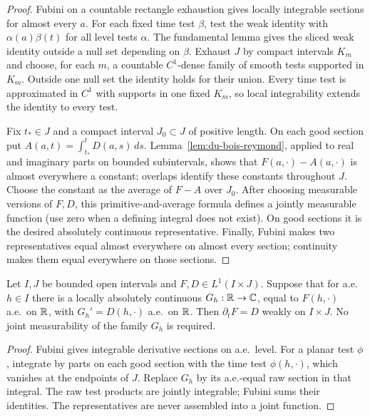\begin{proof}
\leanok
Fubini on a countable rectangle exhaustion gives locally integrable
sections for almost every $a$. For each fixed time test $\beta$, test
the weak identity with $\alpha(a)\beta(t)$ for all level tests $\alpha$.
The fundamental lemma gives the sliced weak identity outside a null
set depending on $\beta$. Exhaust $J$ by compact intervals $K_m$ and
choose, for each $m$, a countable $C^1$-dense family of smooth tests
supported in $K_m$. Outside one null set the identity holds for their
union. Every time test is approximated in $C^1$ with supports in one
fixed $K_m$, so local integrability extends the identity to every test.

Fix $t_*\in J$ and a compact interval $J_0\subset J$ of positive length.
On each good section put
$A(a,t)=\int_{t_*}^tD(a,s)\,ds$. Lemma~\ref{lem:du-bois-reymond},
applied to real and imaginary parts on bounded subintervals, shows that
$F(a,\cdot)-A(a,\cdot)$ is almost everywhere a constant; overlaps identify
these constants throughout $J$. Choose the constant as the average of
$F-A$ over $J_0$. After choosing measurable versions of $F,D$, this
primitive-and-average formula defines a jointly measurable function
(use zero when a defining integral does not exist). On good sections it
is the desired absolutely continuous representative. Finally, Fubini
makes two representatives equal almost everywhere on almost every
section; continuity makes them equal everywhere on those sections.
\end{proof}

\begin{lemma}
\label{lem:acl-weak-converse}
\leanok
Let $I,J$ be bounded open intervals and $F,D\in L^1(I\times J)$.
Suppose that for a.e.\ $h\in I$ there is a locally absolutely
continuous $G_h:\mathbb{R}\to\mathbb{C}$, equal to $F(h,\cdot)$ a.e.\ on $\mathbb{R}$,
with $G_h'=D(h,\cdot)$ a.e.\ on $\mathbb{R}$.
Then $\partial_tF=D$ weakly on $I\times J$.
No joint measurability of the family $G_h$ is required.
\end{lemma}

\begin{proof}
\leanok
Fubini gives integrable derivative sections on a.e.\ level.
For a planar test $\phi$, integrate by parts on each good section
with the time test $\phi(h,\cdot)$, which vanishes at the endpoints
of $J$. Replace $G_h$ by its a.e.-equal raw section in that integral.
The raw test products are jointly integrable; Fubini sums their
identities. The representatives are never assembled into a joint function.
\end{proof}

